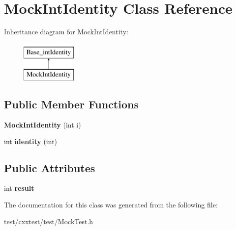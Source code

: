 \hypertarget{classMockIntIdentity}{\section{Mock\-Int\-Identity Class Reference}
\label{classMockIntIdentity}
}
Inheritance diagram for Mock\-Int\-Identity\-:\begin{figure}[H]
\begin{center}
\leavevmode
\includegraphics[height=2.000000cm]{classMockIntIdentity}
\end{center}
\end{figure}
\subsection*{Public Member Functions}
\begin{DoxyCompactItemize}
\item 
\hypertarget{classMockIntIdentity_a47da3bd62e2fd55fa73f4223fd196fa9}{{\bfseries Mock\-Int\-Identity} (int i)}\label{classMockIntIdentity_a47da3bd62e2fd55fa73f4223fd196fa9}

\item 
\hypertarget{classMockIntIdentity_ac69c537c8dc80b16dd39804b9b7d7a62}{int {\bfseries identity} (int)}\label{classMockIntIdentity_ac69c537c8dc80b16dd39804b9b7d7a62}

\end{DoxyCompactItemize}
\subsection*{Public Attributes}
\begin{DoxyCompactItemize}
\item 
\hypertarget{classMockIntIdentity_a8766e60156c874f001ddfcde6a7b56a3}{int {\bfseries result}}\label{classMockIntIdentity_a8766e60156c874f001ddfcde6a7b56a3}

\end{DoxyCompactItemize}


The documentation for this class was generated from the following file\-:\begin{DoxyCompactItemize}
\item 
test/cxxtest/test/Mock\-Test.\-h\end{DoxyCompactItemize}
